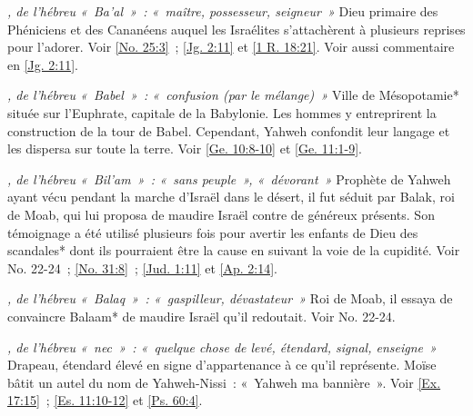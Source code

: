 \begin{multicols}{2}
\textit{, de l'hébreu «~Ba'al~»~: «~maître, possesseur, seigneur~»}\newline
Dieu primaire des Phéniciens et des Cananéens auquel les Israélites s'attachèrent à plusieurs reprises pour l'adorer.\newline
Voir \vref{No. 25:3}~; \vref{Jg. 2:11} et \vref{1 R. 18:21}. Voir aussi commentaire en \vref{Jg. 2:11}.

\textit{, de l'hébreu «~Babel~»~: «~confusion (par le mélange)~»}\newline
Ville de Mésopotamie* située sur l'Euphrate, capitale de la Babylonie. Les hommes y entreprirent la construction de la tour de Babel. Cependant, Yahweh confondit leur langage et les dispersa sur toute la terre.\newline
Voir \vref{Ge. 10:8-10} et \vref{Ge. 11:1-9}.

\textit{, de l'hébreu «~Bil'am~»~: «~sans peuple~», «~dévorant~»}\newline
Prophète de Yahweh ayant vécu pendant la marche d'Israël dans le désert, il fut séduit par Balak, roi de Moab, qui lui proposa de maudire Israël contre de généreux présents. Son témoignage a été utilisé plusieurs fois pour avertir les enfants de Dieu des scandales* dont ils pourraient être la cause en suivant la voie de la cupidité.\newline
Voir No. 22-24~; \vref{No. 31:8}~; \vref{Jud. 1:11} et \vref{Ap. 2:14}.

\textit{, de l'hébreu «~Balaq~»~: «~gaspilleur, dévastateur~»}\newline
Roi de Moab, il essaya de convaincre Balaam* de maudire Israël qu'il redoutait.\newline
Voir No. 22-24.

\textit{, de l'hébreu «~nec~»~: «~quelque chose de levé, étendard, signal, enseigne~»}\newline
Drapeau, étendard élevé en signe d'appartenance à ce qu'il représente. Moïse bâtit un autel du nom de Yahweh-Nissi~: «~Yahweh ma bannière~».\newline
Voir \vref{Ex. 17:15}~; \vref{Es. 11:10-12} et \vref{Ps. 60:4}.


\end{multicols}
